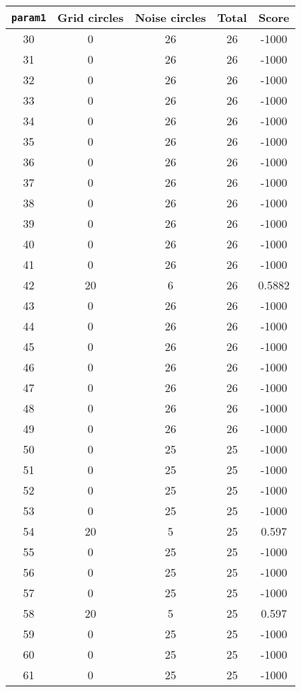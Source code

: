 \documentclass[letterpaper, 12pt]{article}
\begin{document}
\begin{longtable}{|c|c|c|c|c|}
\hline
\textbf{\texttt{param1}} & \textbf{Grid circles} & \textbf{Noise circles} & \textbf{Total} & \textbf{Score} \\
\hline
30 & 0 & 26 & 26 & -1000 \\
\hline
31 & 0 & 26 & 26 & -1000 \\
\hline
32 & 0 & 26 & 26 & -1000 \\
\hline
33 & 0 & 26 & 26 & -1000 \\
\hline
34 & 0 & 26 & 26 & -1000 \\
\hline
35 & 0 & 26 & 26 & -1000 \\
\hline
36 & 0 & 26 & 26 & -1000 \\
\hline
37 & 0 & 26 & 26 & -1000 \\
\hline
38 & 0 & 26 & 26 & -1000 \\
\hline
39 & 0 & 26 & 26 & -1000 \\
\hline
40 & 0 & 26 & 26 & -1000 \\
\hline
41 & 0 & 26 & 26 & -1000 \\
\hline
42 & 20 & 6 & 26 & 0.5882 \\
\hline
43 & 0 & 26 & 26 & -1000 \\
\hline
44 & 0 & 26 & 26 & -1000 \\
\hline
45 & 0 & 26 & 26 & -1000 \\
\hline
46 & 0 & 26 & 26 & -1000 \\
\hline
47 & 0 & 26 & 26 & -1000 \\
\hline
48 & 0 & 26 & 26 & -1000 \\
\hline
49 & 0 & 26 & 26 & -1000 \\
\hline
50 & 0 & 25 & 25 & -1000 \\
\hline
51 & 0 & 25 & 25 & -1000 \\
\hline
52 & 0 & 25 & 25 & -1000 \\
\hline
53 & 0 & 25 & 25 & -1000 \\
\hline
54 & 20 & 5 & 25 & 0.597 \\
\hline
55 & 0 & 25 & 25 & -1000 \\
\hline
56 & 0 & 25 & 25 & -1000 \\
\hline
57 & 0 & 25 & 25 & -1000 \\
\hline
58 & 20 & 5 & 25 & 0.597 \\
\hline
59 & 0 & 25 & 25 & -1000 \\
\hline
60 & 0 & 25 & 25 & -1000 \\
\hline
61 & 0 & 25 & 25 & -1000 \\

\end{longtable}
\end{document}
